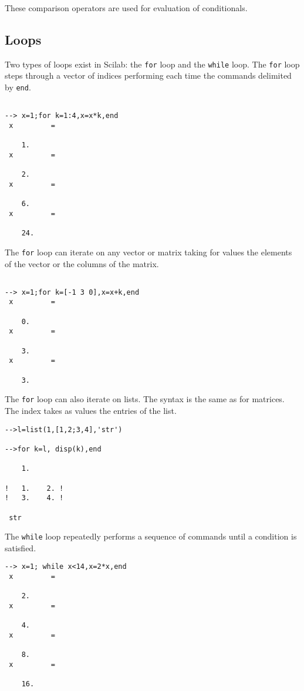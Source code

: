 These comparison operators are used for evaluation of conditionals.

\subsection{Loops}
Two types of loops exist in Scilab: the 
{\tt for} loop
and the 
{\tt while} loop.  The {\tt for} loop
steps through a vector of indices performing each time the
commands delimited by {\tt end}.  
\begin{verbatim}
 
--> x=1;for k=1:4,x=x*k,end
 x         =
 
    1.  
 x         =
 
    2.  
 x         =
 
    6.  
 x         =
 
    24.  
\end{verbatim}
The {\tt for} loop can iterate on any vector or matrix taking for values
the elements of the vector or the columns of the matrix.
\begin{verbatim}
 
--> x=1;for k=[-1 3 0],x=x+k,end
 x         =
 
    0.  
 x         =
 
    3.  
 x         =
 
    3.  
\end{verbatim}
The {\tt for} loop can also iterate on lists. The syntax is the same as for
matrices. The index takes as values the entries of the list.

\begin{verbatim}
-->l=list(1,[1,2;3,4],'str')

-->for k=l, disp(k),end
 
    1.  
 
!   1.    2. !
!   3.    4. !
 
 str
\end{verbatim}

        The {\tt while} loop repeatedly performs a sequence of commands 
until a condition is satisfied.
\begin{verbatim}
--> x=1; while x<14,x=2*x,end
 x         =
 
    2.  
 x         =
 
    4.  
 x         =
 
    8.  
 x         =
 
    16.  

\end{verbatim}

